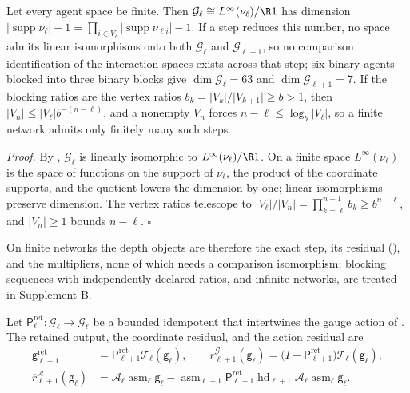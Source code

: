 Let every agent space be finite. Then $\mathcal G_\ell\cong
L^\infty(\nu_\ell)/\R1$ has dimension
$\lvert\operatorname{supp}\nu_\ell\rvert-1
=\prod_{i\in V_\ell}\lvert\operatorname{supp}\nu_{\ell i}\rvert-1$. If a step reduces
this number, no space admits linear isomorphisms onto both $\mathcal G_\ell$ and
$\mathcal G_{\ell+1}$, so no comparison identification of the interaction spaces
exists across that step; six binary agents blocked into three binary blocks give
$\dim\mathcal G_\ell=63$ and $\dim\mathcal G_{\ell+1}=7$. If the blocking ratios are
the vertex ratios $b_k=\lvert V_k\rvert/\lvert V_{k+1}\rvert\ge b>1$, then
$\lvert V_n\rvert\le\lvert V_\ell\rvert b^{-(n-\ell)}$, and a nonempty $V_n$ forces
$n-\ell\le\log_b\lvert V_\ell\rvert$, so a finite network admits only finitely many
such steps. 

\noindent\emph{Proof.}
By , $\mathcal G_\ell$ is linearly
isomorphic to $L^\infty(\nu_\ell)/\R1$. On a finite space $L^\infty(\nu_\ell)$ is the
space of functions on the support of $\nu_\ell$, the product of the coordinate
supports, and the quotient lowers the dimension by one; linear isomorphisms
preserve dimension. The vertex ratios telescope to
$\lvert V_\ell\rvert/\lvert V_n\rvert=\prod_{k=\ell}^{n-1}b_k\ge b^{n-\ell}$, and
$\lvert V_n\rvert\ge1$ bounds $n-\ell$. $\square$

On finite networks the depth objects are therefore the exact step, its residual
(), and the multipliers, none of which needs a
comparison isomorphism; blocking sequences with independently declared ratios, and
infinite networks, are treated in Supplement B.

Let $\mathsf P^{\mathrm{ret}}_\ell:\mathcal G_\ell\to\mathcal G_\ell$ be a bounded
idempotent that intertwines the gauge action of
. The retained output, the coordinate
residual, and the action residual are
\begin{align}
\mathsf g^{\mathrm{ret}}_{\ell+1}&=\mathsf P^{\mathrm{ret}}_{\ell+1}\mathcal T_\ell(\mathsf g_\ell),
\qquad
r^{\mathcal G}_{\ell+1}(\mathsf g_\ell)
=\bigl(I-\mathsf P^{\mathrm{ret}}_{\ell+1}\bigr)\mathcal T_\ell(\mathsf g_\ell),
\label{eq:rg-interaction-coordinate-residual}\\
\overline r^{\mathcal A}_{\ell+1}(\mathsf g_\ell)
&=\overline{\mathcal A}_\ell\operatorname{asm}_\ell\mathsf g_\ell
-\operatorname{asm}_{\ell+1}\mathsf P^{\mathrm{ret}}_{\ell+1}\operatorname{hd}_{\ell+1}
\overline{\mathcal A}_\ell\operatorname{asm}_\ell\mathsf g_\ell .
\label{eq:rg-interaction-action-residual}
\end{align}

